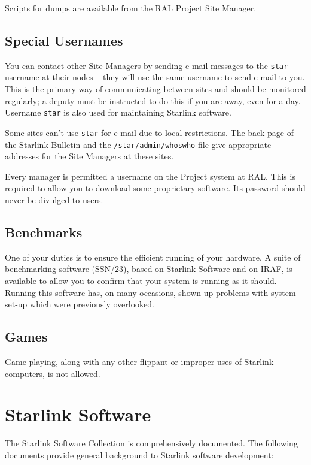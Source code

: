 \documentclass[twoside,11pt]{article}
\newcommand{\xref}[3]{#1}
\begin{document}
Scripts for dumps are available from the RAL Project Site Manager.

\subsection {Special Usernames}

You can contact other Site Managers by sending e-mail messages to the {\tt star}
username at their nodes  -- they will use the same username to send e-mail to
you.
This is the primary way of communicating between sites and
should be monitored regularly; a deputy must be instructed to do this if you
are away, even for a day.
Username {\tt star} is also used for maintaining Starlink software.

Some sites can't use {\tt star} for e-mail due to local restrictions.
The back page of the Starlink Bulletin and the {\tt /star/admin/whoswho} file
give appropriate addresses for the Site Managers at these sites.

Every manager is permitted a username on the Project system at RAL.
This is required to allow you to download some proprietary software.
Its password should never be divulged to users.

\subsection {Benchmarks}

One of your duties is to ensure the efficient running of your hardware. 
A suite of benchmarking software
(\xref{SSN/23}{ssn23}{}),
based on Starlink Software and on IRAF, is available to allow you to confirm
that your system is running as it should.
Running this software has, on many occasions, shown up problems with system
set-up which were previously overlooked.

\subsection {Games}

Game playing, along with any other flippant or improper uses of Starlink
computers, is not allowed.

\newpage

\section {\label{starlinksoftware}Starlink Software}

The Starlink Software Collection is comprehensively documented.
The following documents provide general background to Starlink software
development:
\end{document}
